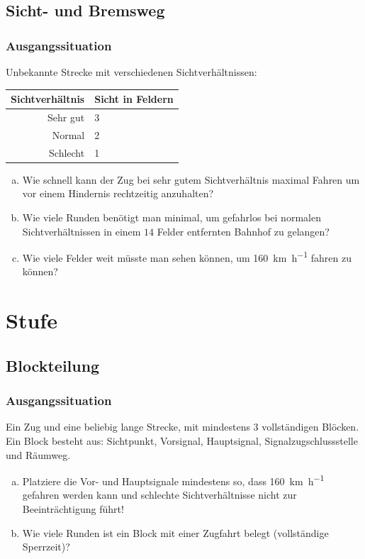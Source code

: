 \documentclass[
    nexus,      %
    10pt,        %
    oneside,
    draft=true,
    green,
]{tubsbook} %
\begin{document}
  \newpage
  \section{Sicht- und Bremsweg}
    \subsection*{Ausgangssituation}

    Unbekannte Strecke mit verschiedenen Sichtverhältnissen:\\[0.5cm]
    \begin{tabular}{rl}
      \toprule
      Sichtverhältnis & Sicht in Feldern \\
      \hline
      Sehr gut & 3 \\
      Normal   & 2 \\
      Schlecht & 1 \\
      \bottomrule
    \end{tabular}
    \aufgabe
    \begin{enumerate}[a)]
      \item Wie schnell kann der Zug bei sehr gutem Sichtverhältnis maximal Fahren um vor einem Hindernis rechtzeitig anzuhalten?
      \item Wie viele Runden benötigt man minimal, um gefahrlos bei normalen Sichtverhältnissen in einem $14$ Felder entfernten Bahnhof zu gelangen?
      \item Wie viele Felder weit müsste man sehen können, um \SI{160}{\kilo\metre\per\hour} fahren zu können?
    \end{enumerate}

  \chapter{Stufe}
  \section{Blockteilung}
    \subsection*{Ausgangssituation}
    Ein Zug und eine beliebig lange Strecke, mit mindestens 3 vollständigen Blöcken.
    Ein Block besteht aus: Sichtpunkt, Vorsignal, Hauptsignal, Signalzugschlussstelle und Räumweg.
    \aufgabe
    \begin{enumerate}[a)]
      \item Platziere die Vor- und Hauptsignale mindestens so, dass \SI{160}{\kilo\metre\per\hour} gefahren werden kann und schlechte Sichtverhältnisse nicht zur Beeinträchtigung führt!
      \item Wie viele Runden ist ein Block mit einer Zugfahrt belegt (vollständige Sperrzeit)?
    \end{enumerate}
\end{document}
